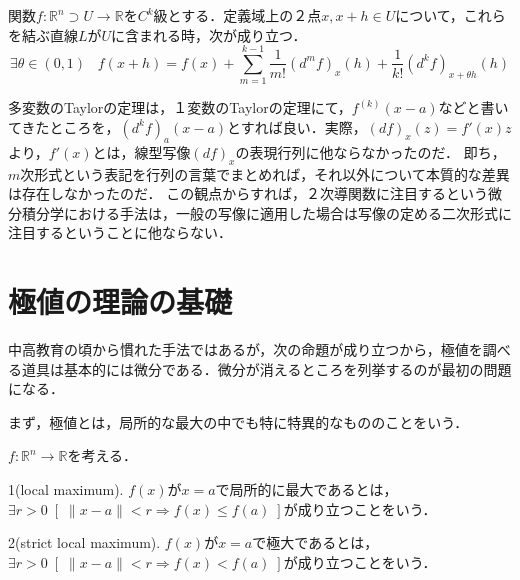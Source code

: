 \documentclass[uplatex, dvipdfmx]{jsreport}
\begin{document}
\begin{theorem}[多変数のTaylorの定理]
    関数$f:\mathbb{R}^n\supset U\to\mathbb{R}$を$C^k$級とする．定義域上の２点$x,x+h\in U$について，これらを結ぶ直線$L$が$U$に含まれる時，次が成り立つ．
    \[ \exists \theta\in(0,1)\;\;\; f(x+h)=f(x)+\sum^{k-1}_{m=1}\frac{1}{m!}(d^mf)_x(h)+\frac{1}{k!}(d^kf)_{x+\theta h}(h)  \]
\end{theorem}

\begin{screen}
    多変数のTaylorの定理は，１変数のTaylorの定理にて，$f^{(k)}(x-a)$などと書いてきたところを，$(d^kf)_{a}(x-a)$とすれば良い．実際，$(df)_x(z)=f'(x)z$より，$f'(x)$とは，線型写像$(df)_x$の表現行列に他ならなかったのだ．
    即ち，$m$次形式という表記を行列の言葉でまとめれば，それ以外について本質的な差異は存在しなかったのだ．
    この観点からすれば，２次導関数に注目するという微分積分学における手法は，一般の写像に適用した場合は写像の定める二次形式に注目するということに他ならない．
\end{screen}

\section{極値の理論の基礎}
中高教育の頃から慣れた手法ではあるが，次の命題が成り立つから，極値を調べる道具は基本的には微分である．微分が消えるところを列挙するのが最初の問題になる．

まず，極値とは，局所的な最大の中でも特に特異的なもののことをいう．
\begin{definition}[極値 extremum]
    $f:\mathbb{R}^n\to\mathbb{R}$を考える．

    1(local maximum). $f(x)$が$x=a$で局所的に最大であるとは，$\exists r>0\; [\;\|x-a\|<r\Rightarrow f(x)\le f(a)\;]$が成り立つことをいう．

    2(strict local maximum). $f(x)$が$x=a$で極大であるとは，$\exists r>0\; [\;\|x-a\|<r\Rightarrow f(x)< f(a)\;]$が成り立つことをいう．
\end{definition}
\end{document}
